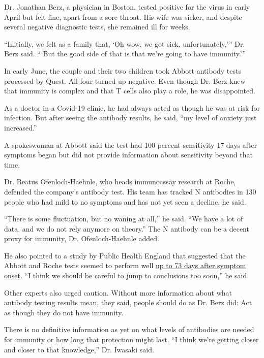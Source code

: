 Dr. Jonathan Berz, a physician in Boston, tested positive for the virus
in early April but felt fine, apart from a sore throat. His wife was
sicker, and despite several negative diagnostic tests, she remained ill
for weeks.

``Initially, we felt as a family that, `Oh wow, we got sick,
unfortunately,''' Dr. Berz said. ```But the good side of that is that
we're going to have immunity.'''

In early June, the couple and their two children took Abbott antibody
tests processed by Quest. All four turned up negative. Even though Dr.
Berz knew that immunity is complex and that T cells also play a role, he
was disappointed.

As a doctor in a Covid-19 clinic, he had always acted as though he was
at risk for infection. But after seeing the antibody results, he said,
``my level of anxiety just increased.''

A spokeswoman at Abbott said the test had 100 percent sensitivity 17
days after symptoms began but did not provide information about
sensitivity beyond that time.

Dr. Beatus Ofenloch-Haehnle, who heads immunoassay research at Roche,
defended the company's antibody test. His team has tracked N antibodies
in 130 people who had mild to no symptoms and has not yet seen a
decline, he said.

``There is some fluctuation, but no waning at all,'' he said. ``We have
a lot of data, and we do not rely anymore on theory.'' The N antibody
can be a decent proxy for immunity, Dr. Ofenloch-Haehnle added.

He also pointed to a study by Public Health England that suggested that
the Abbott and Roche tests seemed to perform well
\href{https://assets.publishing.service.gov.uk/government/uploads/system/uploads/attachment_data/file/898437/Evaluation__of_sensitivity_and_specificity_of_4_commercially_available_SARS-CoV-2_antibody_immunoassays.pdf}{up
to 73 days after symptom onset}. ``I think we should be careful to jump
to conclusions too soon,'' he said.

Other experts also urged caution. Without more information about what
antibody testing results mean, they said, people should do as Dr. Berz
did: Act as though they do not have immunity.

There is no definitive information as yet on what levels of antibodies
are needed for immunity or how long that protection might last. ``I
think we're getting closer and closer to that knowledge,'' Dr. Iwasaki
said.

